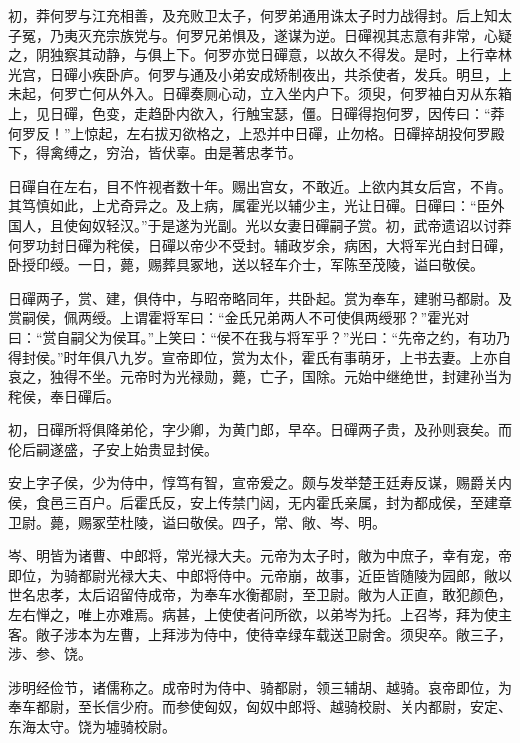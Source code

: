 \documentclass[12pt,UTF8]{ctexbook}
\begin{document}
初，莽何罗与江充相善，及充败卫太子，何罗弟通用诛太子时力战得封。后上知太子冤，乃夷灭充宗族党与。何罗兄弟惧及，遂谋为逆。日磾视其志意有非常，心疑之，阴独察其动静，与俱上下。何罗亦觉日磾意，以故久不得发。是时，上行幸林光宫，日磾小疾卧庐。何罗与通及小弟安成矫制夜出，共杀使者，发兵。明旦，上未起，何罗亡何从外入。日磾奏厕心动，立入坐内户下。须臾，何罗袖白刃从东箱上，见日磾，色变，走趋卧内欲入，行触宝瑟，僵。日磾得抱何罗，因传曰：“莽何罗反！”上惊起，左右拔刃欲格之，上恐并中日磾，止勿格。日磾捽胡投何罗殿下，得禽缚之，穷治，皆伏辜。由是著忠孝节。



日磾自在左右，目不忤视者数十年。赐出宫女，不敢近。上欲内其女后宫，不肯。其笃慎如此，上尤奇异之。及上病，属霍光以辅少主，光让日磾。日磾曰：“臣外国人，且使匈奴轻汉。”于是遂为光副。光以女妻日磾嗣子赏。初，武帝遗诏以讨莽何罗功封日磾为秺侯，日磾以帝少不受封。辅政岁余，病困，大将军光白封日磾，卧授印绶。一日，薨，赐葬具冢地，送以轻车介士，军陈至茂陵，谥曰敬侯。



日磾两子，赏、建，俱侍中，与昭帝略同年，共卧起。赏为奉车，建驸马都尉。及赏嗣侯，佩两绶。上谓霍将军曰：“金氏兄弟两人不可使俱两绶邪？”霍光对曰：“赏自嗣父为侯耳。”上笑曰：“侯不在我与将军乎？”光曰：“先帝之约，有功乃得封侯。”时年俱八九岁。宣帝即位，赏为太仆，霍氏有事萌牙，上书去妻。上亦自哀之，独得不坐。元帝时为光禄勋，薨，亡子，国除。元始中继绝世，封建孙当为秺侯，奉日磾后。



初，日磾所将俱降弟伦，字少卿，为黄门郎，早卒。日磾两子贵，及孙则衰矣。而伦后嗣遂盛，子安上始贵显封侯。



安上字子侯，少为侍中，惇笃有智，宣帝爰之。颇与发举楚王廷寿反谋，赐爵关内侯，食邑三百户。后霍氏反，安上传禁门闼，无内霍氏亲属，封为都成侯，至建章卫尉。薨，赐冢茔杜陵，谥曰敬侯。四子，常、敞、岑、明。



岑、明皆为诸曹、中郎将，常光禄大夫。元帝为太子时，敞为中庶子，幸有宠，帝即位，为骑都尉光禄大夫、中郎将侍中。元帝崩，故事，近臣皆随陵为园郎，敞以世名忠孝，太后诏留侍成帝，为奉车水衡都尉，至卫尉。敞为人正直，敢犯颜色，左右惮之，唯上亦难焉。病甚，上使使者问所欲，以弟岑为托。上召岑，拜为使主客。敞子涉本为左曹，上拜涉为侍中，使待幸绿车载送卫尉舍。须臾卒。敞三子，涉、参、饶。



涉明经俭节，诸儒称之。成帝时为侍中、骑都尉，领三辅胡、越骑。哀帝即位，为奉车都尉，至长信少府。而参使匈奴，匈奴中郎将、越骑校尉、关内都尉，安定、东海太守。饶为墟骑校尉。
\end{document}
